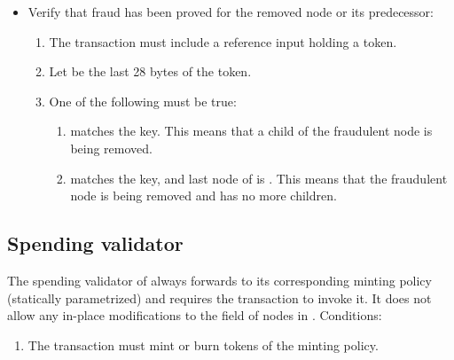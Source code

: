 \documentclass[../midgard.tex]{subfiles}
\begin{document}
\begin{description}
\begin{itemize}
        \item Verify that fraud has been proved for the removed node or its predecessor:
        \begin{enumerate}[resume]
            \item The transaction must include a reference input holding a  token.
            \item Let  be the last 28 bytes of the  token.
            \item One of the following must be true:
                \begin{enumerate}
                    \item {} matches the  key.
                      This means that a child of the fraudulent node is being removed.
                    \item {} matches the  key, and last node of  is .
                      This means that the fraudulent node is being removed and has no more children.
                \end{enumerate}
        \end{enumerate}
    \end{itemize}
\end{description}

\todo

\subsection{Spending validator}
\label{h:state-queue-spending-validator}

The spending validator of  always forwards to its corresponding minting policy (statically parametrized) and requires the transaction to invoke it.
It does not allow any in-place modifications to the  field of nodes in .
Conditions:
\begin{enumerate}
    \item The transaction must mint or burn tokens of the  minting policy.
\end{enumerate}
\end{document}
